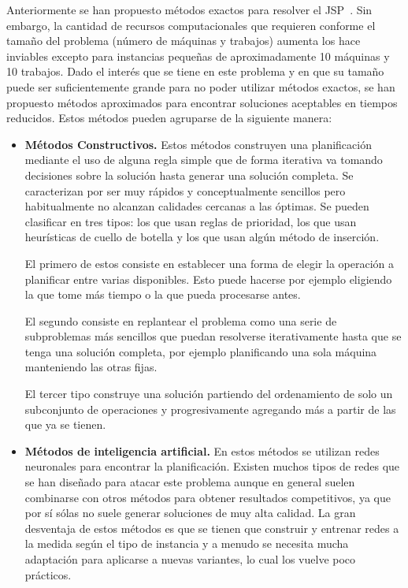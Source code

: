 Anteriormente se han propuesto métodos exactos para resolver el JSP~\cite{Brucker1994}. 
%
Sin embargo, la cantidad de recursos computacionales que requieren conforme el tamaño del problema (número de máquinas y trabajos) aumenta los hace inviables excepto 
para instancias pequeñas de aproximadamente 10 máquinas y 10 trabajos.
%
Dado el interés que se tiene en este problema y en que su tamaño puede ser suficientemente grande para no poder utilizar métodos exactos, se han propuesto métodos aproximados 
para encontrar soluciones aceptables en tiempos reducidos. 
%
Estos métodos pueden agruparse de la siguiente manera\cite{jain1998state,Zhang2019}:
\begin{itemize}
\item \textbf{Métodos Constructivos.} Estos métodos construyen una planificación mediante el uso de alguna regla simple que de forma iterativa va tomando decisiones sobre la solución
hasta generar una solución completa. Se caracterizan por ser muy rápidos y conceptualmente sencillos pero habitualmente no alcanzan calidades cercanas a las óptimas.
Se pueden clasificar en tres tipos: los que usan reglas de prioridad, los que usan heurísticas de cuello de botella y los que usan algún método de inserción.

El primero de estos consiste en establecer una forma de elegir la operación a planificar entre varias disponibles. Esto puede hacerse por ejemplo eligiendo la que tome 
más tiempo o la que pueda procesarse antes.

El segundo consiste en replantear el problema como una serie de subproblemas más sencillos que puedan resolverse iterativamente hasta que se tenga una solución completa, 
por ejemplo planificando una sola máquina manteniendo las otras fijas.

El tercer tipo construye una solución partiendo del ordenamiento de solo un subconjunto de operaciones y progresivamente agregando más a partir de las que ya se tienen.

\item \textbf{Métodos de inteligencia artificial.} En estos métodos se utilizan redes neuronales para encontrar la planificación. Existen muchos tipos de redes que se 
han diseñado para atacar este problema aunque en general suelen combinarse con otros métodos para obtener resultados competitivos, ya que por sí sólas no suele generar
soluciones de muy alta calidad. La gran desventaja de estos métodos es que se tienen que construir y entrenar redes a la medida según el tipo de instancia y a menudo 
se necesita mucha adaptación para aplicarse a nuevas variantes, lo cual los vuelve poco prácticos.


\end{itemize}
